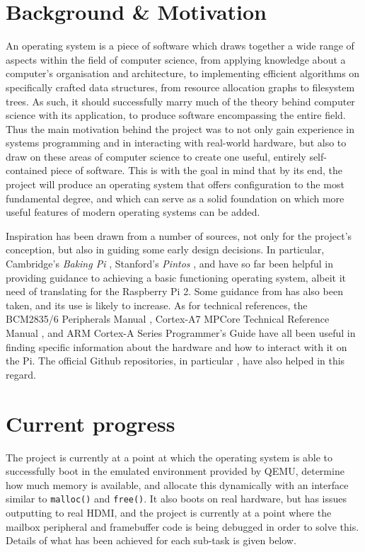 \documentclass[10pt,a4paper]{article}
\newcommand{\code}[1]{\texttt{#1}}
\begin{document}
\section*{Background \& Motivation}
An operating system is a piece of software which draws together a wide range of
aspects within the field of computer science, from applying knowledge about a
computer's organisation and architecture, to implementing efficient algorithms
on specifically crafted data structures, from resource allocation graphs to
filesystem trees. As such, it should successfully marry much of the theory
behind computer science with its application, to produce software encompassing
the entire field. Thus the main motivation behind the project was to not only
gain experience in systems programming and in interacting with real-world
hardware, but also to draw on these areas of computer science to create one
useful, entirely self-contained piece of software. This is with the goal in mind
that by its end, the project will produce an operating system that offers
configuration to the most fundamental degree, and which can serve as a solid
foundation on which more useful features of modern operating systems can be
added.

Inspiration has been drawn from a number of sources, not only for the project's
conception, but also in guiding some early design decisions. In particular,
Cambridge's \textit{Baking Pi} \cite{BakingPi}, Stanford's \textit{Pintos}
\cite{Pintos}, and \cite{jsandler} have so far been helpful in providing
guidance to achieving a basic functioning operating system, albeit it need of
translating for the Raspberry Pi 2. Some guidance from \cite{littleosbook} has
also been taken, and its use is likely to increase. As for technical references,
the BCM2835/6 Peripherals Manual \cite{BCM2835, BCM2836}, Cortex-A7 MPCore
Technical Reference Manual \cite{TRM}, and ARM Cortex-A Series Programmer's
Guide \cite{PG} have all been useful in finding specific information about the
hardware and how to interact with it on the Pi. The official Github
repositories, in particular \cite{PiDocumentation}, have also helped in this
regard.

\section*{Current progress}
The project is currently at a point at which the operating system is able to
successfully boot in the emulated environment provided by QEMU, determine how
much memory is available, and allocate this dynamically with an interface
similar to \code{malloc()} and \code{free()}. It also boots on real hardware,
but has issues outputting to real HDMI, and the project is currently at a point
where the mailbox peripheral and framebuffer code is being debugged in order to
solve this. Details of what has been achieved for each sub-task is given below.
\end{document}
